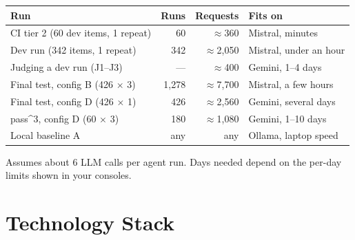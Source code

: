 \documentclass[11pt,a4paper]{article}
\begin{document}
\begin{center}
\small
\begin{tabular}{@{}l r r l@{}}
\toprule
\textbf{Run} & \textbf{Runs} & \textbf{Requests} & \textbf{Fits on}\\
\midrule
CI tier 2 (60 dev items, 1 repeat) & 60 & $\approx$360 & Mistral, minutes\\
Dev run (342 items, 1 repeat) & 342 & $\approx$2{,}050 & Mistral, under an hour\\
Judging a dev run (J1--J3) & --- & $\approx$400 & Gemini, 1--4 days\\
Final test, config B (426 $\times$ 3) & 1{,}278 & $\approx$7{,}700 & Mistral, a few hours\\
Final test, config D (426 $\times$ 1) & 426 & $\approx$2{,}560 & Gemini, several days\\
pass\^{}3, config D (60 $\times$ 3) & 180 & $\approx$1{,}080 & Gemini, 1--10 days\\
Local baseline A & any & any & Ollama, laptop speed\\
\bottomrule
\end{tabular}

{\footnotesize\color{grey} Assumes about 6 LLM calls per agent run. Days needed depend on the
per-day limits shown in your consoles.}
\end{center}

\section{Technology Stack}
\end{document}
